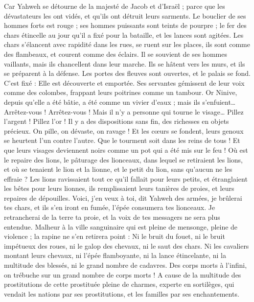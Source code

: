 \begin{multicols}{2}
Car Yahweh se détourne de la majesté de Jacob et d'Israël ; parce que les dévastateurs les ont vidés, et qu'ils ont détruit leurs sarments.
Le bouclier de ses hommes forts est rouge ; ses hommes puissants sont teints de pourpre ; le fer des chars étincelle au jour qu'il a fixé pour la bataille, et les lances sont agitées.
Les chars s’élancent avec rapidité dans les rues, se ruent sur les places, ils sont comme des flambeaux, et courent comme des éclairs.
Il se souvient de ses hommes vaillants, mais ils chancellent dans leur marche. Ils se hâtent vers les murs, et ils se préparent à la défense.
Les portes des fleuves sont ouvertes, et le palais se fond.
C’est fixé : Elle est découverte et emportée. Ses servantes gémissent de leur voix comme des colombes, frappant leurs poitrines comme un tambour.
Or Ninive, depuis qu'elle a été bâtie, a été comme un vivier d'eaux ; mais ils s'enfuient… Arrêtez-vous ! Arrêtez-vous ! Mais il n'y a personne qui tourne le visage…
Pillez l'argent ! Pillez l'or ! Il y a des dispositions sans fin, des richesses en objets précieux.
On pille, on dévaste, on ravage ! Et les cœurs se fondent, leurs genoux se heurtent l'un contre l'autre. Que le tourment soit dans les reins de tous ! Et que leurs visages deviennent noirs comme un pot qui a été mis sur le feu !
Où est le repaire des lions, le pâturage des lionceaux, dans lequel se retiraient les lions, et où se tenaient le lion et la lionne, et le petit du lion, sans qu'aucun ne les effraie ?
Les lions ravissaient tout ce qu'il fallait pour leurs petits, et étranglaient les bêtes pour leurs lionnes, ils remplissaient leurs tanières de proies, et leurs repaires de dépouilles.
Voici, j'en veux à toi, dit Yahweh des armées, je brûlerai tes chars, et ils s'en iront en fumée, l'épée consumera tes lionceaux. Je retrancherai de la terre ta proie, et la voix de tes messagers ne sera plus entendue.
\VerseOne{}Malheur à la ville sanguinaire qui est pleine de mensonge, pleine de violence ; la rapine ne s’en retirera point :
Ni le bruit du fouet, ni le bruit impétueux des roues, ni le galop des chevaux, ni le saut des chars.
Ni les cavaliers montant leurs chevaux, ni l'épée flamboyante, ni la lance étincelante, ni la multitude des blessés, ni le grand nombre de cadavres. Des corps morts à l’infini, on trébuche sur un grand nombre de corps morts !
A cause de la multitude des prostitutions de cette prostituée pleine de charmes, experte en sortilèges, qui vendait les nations par ses prostitutions, et les familles par ses enchantements.

\end{multicols}
